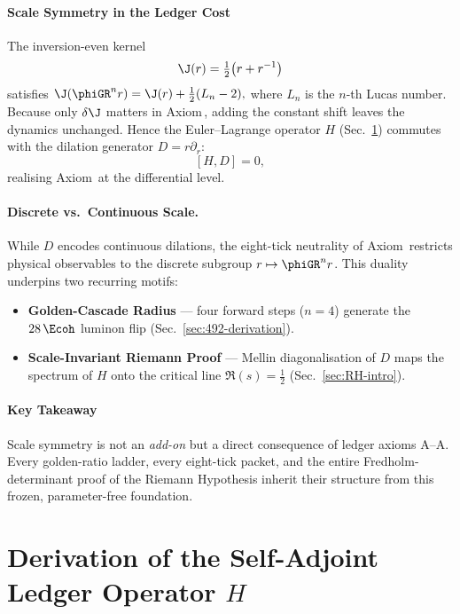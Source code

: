 \documentclass[11pt,oneside]{book}
\begin{document}
{\paragraph{Scale Symmetry in the Ledger Cost}

The inversion-even kernel
\[
   \J(r)=\tfrac12\bigl(r+r^{-1}\bigr)
   \label{eq:J-def-repeat}
\]
satisfies
\(
   \J(\phiGR^{n}r)=\J(r)+\tfrac12(L_{n}-2),
\)
where \(L_{n}\) is the $n$-th Lucas number.  
Because only \(\delta\J\) matters in Axiom\,, adding the
constant shift leaves the dynamics unchanged.  
Hence the Euler–Lagrange operator \(H\) (Sec.~\ref{sec:H-def})
commutes with the dilation generator \(D=r\partial_{r}\):
\[
   [H,D]=0,
\]
realising Axiom\, at the differential level.

\paragraph{Discrete vs.\ Continuous Scale.}
While \(D\) encodes continuous dilations, the eight-tick neutrality of
Axiom\, restricts physical observables to the discrete subgroup
\(
   r\mapsto\phiGR^{n}r
\).
This duality underpins two recurring motifs:

\begin{itemize}\setlength\itemsep{3pt}
\item \textbf{Golden-Cascade Radius} — four forward steps
      (\(n=4\)) generate the $28\,\Ecoh$ luminon flip
      (Sec.~\ref{sec:492-derivation}).
\item \textbf{Scale-Invariant Riemann Proof} — Mellin
      diagonalisation of \(D\) maps the spectrum of \(H\) onto the
      critical line \(\Re(s)=\tfrac12\) 
      (Sec.~\ref{sec:RH-intro}).
\end{itemize}

\paragraph*{Key Takeaway}

Scale symmetry is not an \emph{add-on} but a direct consequence of
ledger axioms A–A.  
Every golden-ratio ladder, every eight-tick packet, and the entire
Fredholm-determinant proof of the Riemann Hypothesis inherit their
structure from this frozen, parameter-free foundation.


\section{Derivation of the Self-Adjoint Ledger Operator \texorpdfstring{$H$}{H}}
\label{sec:H-def}

}
\end{document}
